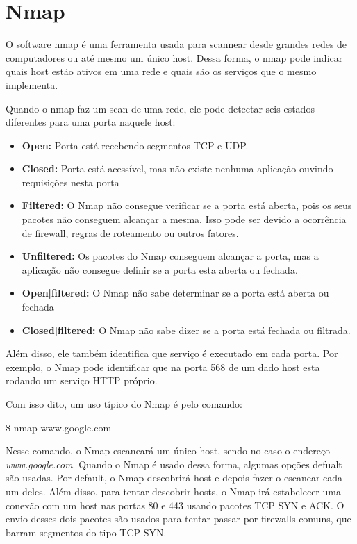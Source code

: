 \section{Nmap}

O software nmap é uma ferramenta usada para scannear desde grandes redes de
computadores ou até mesmo um único host. Dessa forma, o nmap pode indicar quais
host estão ativos em uma rede e quais são os serviços que o mesmo implementa.

Quando o nmap faz um scan de uma rede, ele pode detectar seis estados diferentes
para uma porta naquele host:

\begin{itemize}
    \item \textbf{Open:} Porta está recebendo segmentos TCP e UDP.
    \item \textbf{Closed:} Porta está acessível, mas não existe nenhuma
    aplicação ouvindo requisições nesta porta
    \item \textbf{Filtered:} O Nmap não consegue verificar se a porta está
    aberta, pois os seus pacotes não conseguem alcançar a mesma. Isso pode ser
    devido a ocorrência de firewall, regras de roteamento ou outros fatores.
    \item \textbf{Unfiltered:} Os pacotes do Nmap conseguem alcançar a porta,
    mas a aplicação não consegue definir se a porta esta aberta ou fechada.
    \item \textbf{Open|filtered:} O Nmap não sabe determinar se a porta está
    aberta ou fechada
    \item \textbf{Closed|filtered:} O Nmap não sabe dizer se a porta está
    fechada ou filtrada.
\end{itemize}

Além disso, ele também identifica que serviço é executado em cada porta. Por exemplo, o Nmap pode identificar
que na porta 568 de um dado host esta rodando um serviço HTTP próprio.

Com isso dito, um uso típico do Nmap é pelo comando:

\$ nmap www.google.com

Nesse comando, o Nmap escaneará um único host, sendo no caso o endereço
\textit{www.google.com}. Quando o Nmap é usado dessa forma, algumas opções
defualt são usadas. Por default, o Nmap descobrirá host e depois fazer o
escanear cada um deles. Além disso, para tentar descobrir hosts, o Nmap irá
estabelecer uma conexão com um host nas portas 80 e 443 usando pacotes TCP SYN e ACK.
O envio desses dois pacotes são usados para tentar passar por firewalls comuns, que barram
segmentos do tipo TCP SYN.

